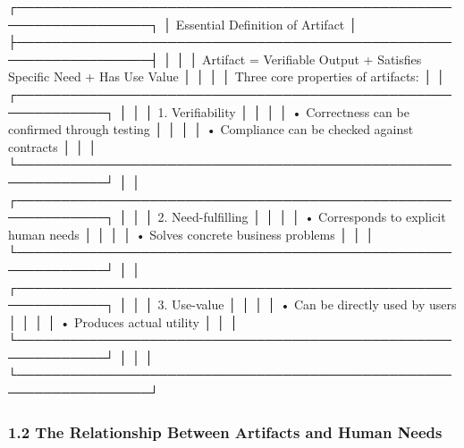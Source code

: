 \documentclass[
]{article}
\newenvironment{Shaded}{}{}
\newcommand{\NormalTok}[1]{#1}
\begin{document}
\begin{Shaded}
\begin{Highlighting}[]
\NormalTok{┌─────────────────────────────────────────────────────────────────┐}
\NormalTok{│                  Essential Definition of Artifact                │}
\NormalTok{├─────────────────────────────────────────────────────────────────┤}
\NormalTok{│                                                                  │}
\NormalTok{│  Artifact = Verifiable Output + Satisfies Specific Need + Has Use Value │}
\NormalTok{│                                                                  │}
\NormalTok{│  Three core properties of artifacts:                             │}
\NormalTok{│  ┌────────────────────────────────────────────────────────────┐ │}
\NormalTok{│  │ 1. Verifiability                                           │ │}
\NormalTok{│  │    • Correctness can be confirmed through testing          │ │}
\NormalTok{│  │    • Compliance can be checked against contracts           │ │}
\NormalTok{│  └────────────────────────────────────────────────────────────┘ │}
\NormalTok{│  ┌────────────────────────────────────────────────────────────┐ │}
\NormalTok{│  │ 2. Need{-}fulfilling                                         │ │}
\NormalTok{│  │    • Corresponds to explicit human needs                   │ │}
\NormalTok{│  │    • Solves concrete business problems                     │ │}
\NormalTok{│  └────────────────────────────────────────────────────────────┘ │}
\NormalTok{│  ┌────────────────────────────────────────────────────────────┐ │}
\NormalTok{│  │ 3. Use{-}value                                               │ │}
\NormalTok{│  │    • Can be directly used by users                         │ │}
\NormalTok{│  │    • Produces actual utility                               │ │}
\NormalTok{│  └────────────────────────────────────────────────────────────┘ │}
\NormalTok{│                                                                  │}
\NormalTok{└─────────────────────────────────────────────────────────────────┘}
\end{Highlighting}
\end{Shaded}

\hypertarget{12-the-relationship-between-artifacts-and-human-needs}{%
\subsubsection{1.2 The Relationship Between Artifacts and Human
Needs}\label{12-the-relationship-between-artifacts-and-human-needs}}
\end{document}
